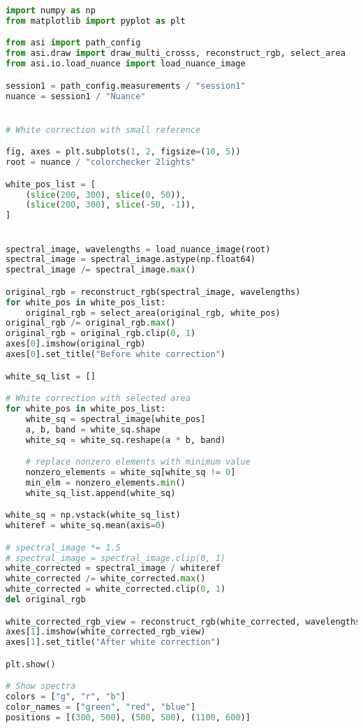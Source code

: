 \begin{lstlisting}[language=python, caption=White correction for Nuance Cmaera with small reference, label={code:wc-nuance-small}]
import numpy as np
from matplotlib import pyplot as plt

from asi import path_config
from asi.draw import draw_multi_crosss, reconstruct_rgb, select_area
from asi.io.load_nuance import load_nuance_image

session1 = path_config.measurements / "session1"
nuance = session1 / "Nuance"


# White correction with small reference

fig, axes = plt.subplots(1, 2, figsize=(10, 5))
root = nuance / "colorchecker 2lights"

white_pos_list = [
    (slice(200, 300), slice(0, 50)),
    (slice(200, 300), slice(-50, -1)),
]


spectral_image, wavelengths = load_nuance_image(root)
spectral_image = spectral_image.astype(np.float64)
spectral_image /= spectral_image.max()

original_rgb = reconstruct_rgb(spectral_image, wavelengths)
for white_pos in white_pos_list:
    original_rgb = select_area(original_rgb, white_pos)
original_rgb /= original_rgb.max()
original_rgb = original_rgb.clip(0, 1)
axes[0].imshow(original_rgb)
axes[0].set_title("Before white correction")

white_sq_list = []

# White correction with selected area
for white_pos in white_pos_list:
    white_sq = spectral_image[white_pos]
    a, b, band = white_sq.shape
    white_sq = white_sq.reshape(a * b, band)

    # replace nonzero elements with minimum value
    nonzero_elements = white_sq[white_sq != 0]
    min_elm = nonzero_elements.min()
    white_sq_list.append(white_sq)

white_sq = np.vstack(white_sq_list)
whiteref = white_sq.mean(axis=0)

# spectral_image *= 1.5
# spectral_image = spectral_image.clip(0, 1)
white_corrected = spectral_image / whiteref
white_corrected /= white_corrected.max()
white_corrected = white_corrected.clip(0, 1)
del original_rgb

white_corrected_rgb_view = reconstruct_rgb(white_corrected, wavelengths)
axes[1].imshow(white_corrected_rgb_view)
axes[1].set_title("After white correction")

plt.show()

# Show spectra
colors = ["g", "r", "b"]
color_names = ["green", "red", "blue"]
positions = [(300, 500), (500, 500), (1100, 600)]



\end{lstlisting}
